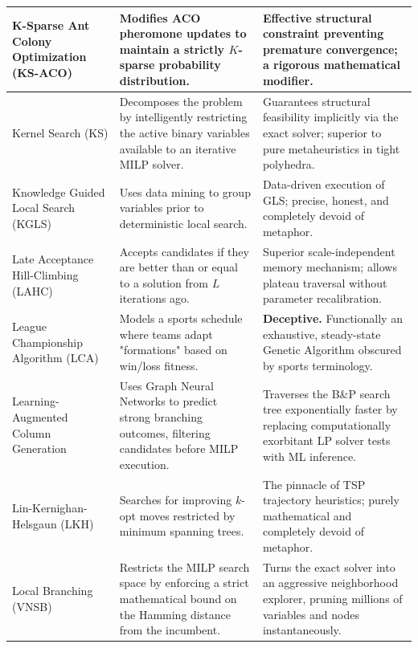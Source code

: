 \begin{center}
\begin{longtable}{
  >{\raggedright\arraybackslash}p{}
  >{\raggedright\arraybackslash}p{}
  >{\raggedright\arraybackslash}p{}
}
K-Sparse Ant Colony Optimization (KS-ACO) & Modifies ACO pheromone updates to maintain a strictly $K$-sparse probability distribution. & Effective structural constraint preventing premature convergence; a rigorous mathematical modifier. \\ \midrule

Kernel Search (KS) & Decomposes the problem by intelligently restricting the active binary variables available to an iterative MILP solver. & Guarantees structural feasibility implicitly via the exact solver; superior to pure metaheuristics in tight polyhedra. \\ \midrule

Knowledge Guided Local Search (KGLS) & Uses data mining to group variables prior to deterministic local search. & Data-driven execution of GLS; precise, honest, and completely devoid of metaphor. \\ \midrule

Late Acceptance Hill-Climbing (LAHC) & Accepts candidates if they are better than or equal to a solution from $L$ iterations ago. & Superior scale-independent memory mechanism; allows plateau traversal without parameter recalibration. \\ \midrule

League Championship Algorithm (LCA) & Models a sports schedule where teams adapt "formations" based on win/loss fitness. & \textbf{Deceptive.} Functionally an exhaustive, steady-state Genetic Algorithm obscured by sports terminology. \\ \midrule

Learning-Augmented Column Generation & Uses Graph Neural Networks to predict strong branching outcomes, filtering candidates before MILP execution. & Traverses the B\&P search tree exponentially faster by replacing computationally exorbitant LP solver tests with ML inference. \\ \midrule

Lin-Kernighan-Helsgaun (LKH) & Searches for improving $k$-opt moves restricted by minimum spanning trees. & The pinnacle of TSP trajectory heuristics; purely mathematical and completely devoid of metaphor. \\ \midrule

Local Branching (VNSB) & Restricts the MILP search space by enforcing a strict mathematical bound on the Hamming distance from the incumbent. & Turns the exact solver into an aggressive neighborhood explorer, pruning millions of variables and nodes instantaneously. \\ \midrule


\end{longtable}
\end{center}
